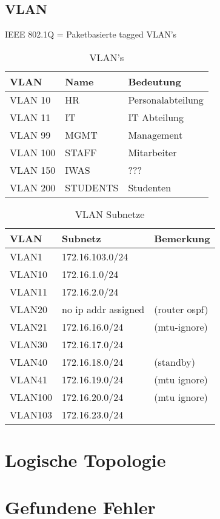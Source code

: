 \subsection{VLAN}
IEEE 802.1Q = Paketbasierte tagged VLAN's
\begin{table}[h]
	\centering
	\begin{tabu} to \linewidth {l l l}
		\toprule 
		VLAN & Name & Bedeutung \\
		\midrule
		VLAN 10 & HR & Personalabteilung \\
		VLAN 11 & IT & IT Abteilung \\
		VLAN 99 & MGMT & Management\\
		VLAN 100 & STAFF & Mitarbeiter\\
		VLAN 150 & IWAS & ???\\
		VLAN 200 & STUDENTS & Studenten\\
		\bottomrule 
	\end{tabu} 
	\caption{VLAN's}
\end{table}

\begin{table}[h]
	\centering
	\begin{tabu} to \linewidth {l l l}
		\toprule 
		VLAN & Subnetz & Bemerkung \\
		\midrule
		VLAN1 & 172.16.103.0/24 & \\
		VLAN10 & 172.16.1.0/24 & \\
		VLAN11 & 172.16.2.0/24 & \\
		VLAN20 & no ip addr assigned & (router ospf) \\
		VLAN21 & 172.16.16.0/24 & (mtu-ignore) \\
		VLAN30 & 172.16.17.0/24 & \\
		VLAN40 & 172.16.18.0/24 & (standby) \\
		VLAN41 & 172.16.19.0/24 & (mtu ignore) \\
		VLAN100 & 172.16.20.0/24 & (mtu ignore) \\
		VLAN103 & 172.16.23.0/24 & \\
		\bottomrule 
	\end{tabu} 
	\caption{VLAN Subnetze}
\end{table}

\section{Logische Topologie}

\section{Gefundene Fehler}
